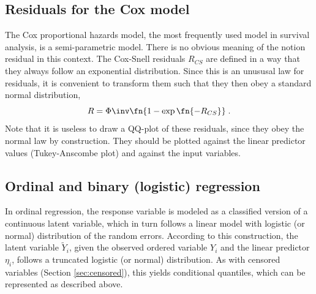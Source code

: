 \documentclass[11pt]{article}\usepackage[]{graphicx}\usepackage[]{color}
\begin{document}
\subsection{Residuals for the Cox model}

The Cox proportional hazards model, the most frequently used model in
survival analysis, is a semi-parametric model. There is no obvious meaning
of the notion residual in this context. 
The Cox-Snell residuals $R_{CS}$ are defined in a way that they always
follow an exponential distribution. 
Since this is an unususal law for residuals, it is convenient to transform
them such that they then obey a standard normal distribution,
\[
  R = \Phi\inv\fn{1-\exp\fn{-R_{CS}}}
\;.\]
Note that it is useless to draw a QQ-plot of these residuals, since they
obey the normal law by construction. 
They should be plotted against the linear predictor values 
(Tukey-Anscombe plot) and against the input variables.



\subsection{Ordinal and binary (logistic) regression}

In ordinal regression, the response variable is modeled as a classified
version of a continuous latent variable, which in turn follows a linear
model with logistic (or normal) distribution of the random errors.
According to this construction, the latent variable $\widetilde Y_i$, given the
observed ordered variable $Y_i$ and the linear predictor $\eta_i$, 
follows a truncated logistic (or normal) distribution. 
As with censored variables (Section \ref{sec:censored}), this yields 
conditional quantiles, which can be represented as described above.
\end{document}
